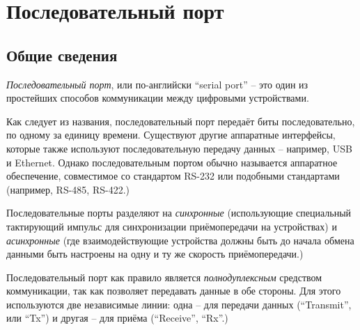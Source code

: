 \documentclass[../sparc.tex]{subfiles}
\begin{document}
\section{Последовательный порт}
\label{section:communication-serial-port}

\subsection{Общие сведения}

\emph{Последовательный порт}, или по-английски ``serial port'' -- это один из
простейших способов коммуникации между цифровыми устройствами.

Как следует из названия, последовательный порт передаёт биты последовательно, по
одному за единицу времени.  Существуют другие аппаратные интерфейсы, которые
также используют последовательную передачу данных -- например, USB и Ethernet.
Однако последовательным портом обычно называется аппаратное обеспечение,
совместимое со стандартом RS-232 или подобными стандартами (например, RS-485,
RS-422.)

Последовательные порты разделяют на \emph{синхронные} (использующие специальный
тактирующий импульс для синхронизации приёмопередачи на устройствах) и
\emph{асинхронные} (где взаимодействующие устройства должны быть до начала
обмена данными быть настроены на одну и ту же скорость приёмопередачи.)

Последовательный порт как правило является \emph{полнодуплексным} средством
коммуникации, так как позволяет передавать данные в обе стороны.  Для этого
используются две независимые линии: одна -- для передачи данных (``Transmit'',
или ``Tx'') и другая -- для приёма (``Receive'', ``Rx''.)
\end{document}
